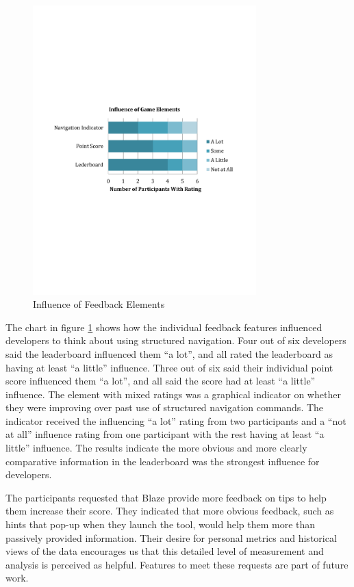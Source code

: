 \documentclass{sig-alternate}
\begin{document}
\begin{figure}
	\includegraphics[width=3.4in]{ElementInfluenceChart.pdf}
	\caption{Influence of Feedback Elements}
	\label{fig:elementInfluence}
\end{figure}

The chart in figure \ref{fig:elementInfluence} shows how the individual feedback features influenced developers to think about using structured navigation.  Four out of six developers said the leaderboard influenced them ``a lot'', and all rated the leaderboard as having at least ``a little'' influence.  Three out of six  said their individual point score influenced them ``a lot'', and all said the score had at least ``a little'' influence.  The element with mixed ratings was a graphical indicator on whether they were improving over past use of structured navigation commands.  The indicator received the influencing ``a lot'' rating from two participants and a ``not at all'' influence rating from one participant with the rest having at least ``a little'' influence.  The results indicate the more obvious and more clearly comparative information in the leaderboard was the strongest influence for developers.

The participants requested that Blaze provide more feedback on tips to help them increase their score. They indicated that more obvious feedback, such as hints that pop-up when they launch the tool, would help them more than passively provided information.  Their desire for personal metrics and historical views of the data encourages us that this detailed level of measurement and analysis is perceived as helpful.  Features to meet these requests are part of future work.    
\end{document}
